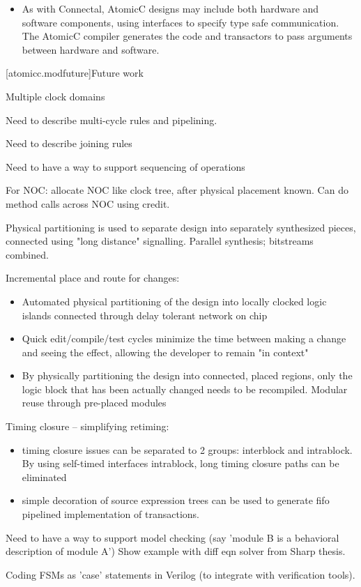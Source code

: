 \begin{itemize}
\item As with Connectal\cite{king2015software}, AtomicC designs may include both hardware and
software components, using interfaces to specify type safe communication.
The AtomicC compiler generates the code and transactors to pass
arguments between hardware and software.

\end{itemize}

[atomicc.modfuture]{Future work}

Multiple clock domains

Need to describe multi-cycle rules and pipelining.

Need to describe joining rules

Need to have a way to support sequencing of operations

For NOC: allocate NOC like clock tree, after physical placement known.  Can do 
method calls across NOC using credit.

Physical partitioning is used to separate design into separately synthesized pieces, connected using
"long distance" signalling.  Parallel synthesis; bitstreams combined.

Incremental place and route for changes:
\begin{itemize}
\item Automated physical partitioning of the design into locally clocked logic islands
connected through delay tolerant network on chip
\item Quick edit/compile/test cycles minimize the time between making a change and
seeing the effect, allowing the developer to remain "in context"
\item By physically partitioning the design into connected, placed regions, only the
logic block that has been actually changed needs to be recompiled.  Modular reuse through pre-placed modules
\end{itemize}

Timing closure -- simplifying retiming:
\begin{itemize}
\item timing closure issues
can be separated to 2 groups: interblock and intrablock.
By using self-timed interfaces intrablock, long timing closure paths can be eliminated
\item simple decoration of source expression trees can be used to generate
fifo pipelined implementation of transactions.
\end{itemize}

Need to have a way to support model checking (say 'module B is a behavioral description of module A')
Show example with diff eqn solver from Sharp thesis.

Coding FSMs as 'case' statements in Verilog (to integrate with verification tools).


